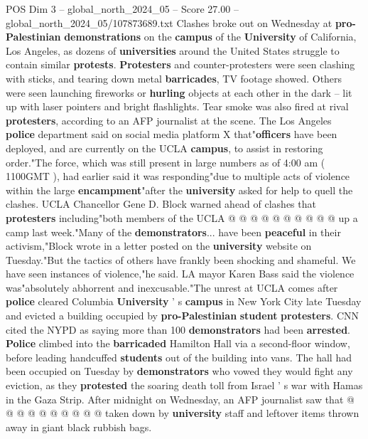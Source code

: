 \begin{textsample}{POS Dim 3 – global\_north\_2024\_05 – Score 27.00 – global\_north\_2024\_05/107873689.txt}  \label{ex:f3_pos_009}
Clashes broke out on Wednesday at \textbf{pro-Palestinian} \textbf{demonstrations} on the \textbf{campus} of the \textbf{University} of California, Los Angeles, as dozens of \textbf{universities} around the United States struggle to contain similar \textbf{protests}. \textbf{Protesters} and counter-protesters were seen clashing with sticks, and tearing down metal \textbf{barricades}, TV footage showed.
Others were seen launching fireworks or \textbf{hurling} objects at each other in the dark -- lit up with laser pointers and bright flashlights.
Tear smoke was also fired at rival \textbf{protesters}, according to an AFP journalist at the scene.
The Los Angeles \textbf{police} department said on social media platform X that"\textbf{officers} have been deployed, and are currently on the UCLA \textbf{campus}, to assist in restoring order."The force, which was still present in large numbers as of 4:00 am ( 1100GMT ), had earlier said it was responding"due to multiple acts of violence within the large \textbf{encampment}"after the \textbf{university} asked for help to quell the clashes.
UCLA Chancellor Gene D.
Block warned ahead of clashes that \textbf{protesters} including"both members of the UCLA @ @ @ @ @ @ @ @ @ @ up a camp last week."Many of the \textbf{demonstrators}... have been \textbf{peaceful} in their activism,"Block wrote in a letter posted on the \textbf{university} website on Tuesday."But the tactics of others have frankly been shocking and shameful.
We have seen instances of violence,"he said.
LA mayor Karen Bass said the violence was"absolutely abhorrent and inexcusable."The unrest at UCLA comes after \textbf{police} cleared Columbia \textbf{University} ' s \textbf{campus} in New York City late Tuesday and evicted a building occupied by \textbf{pro-Palestinian} \textbf{student} \textbf{protesters}.
CNN cited the NYPD as saying more than 100 \textbf{demonstrators} had been \textbf{arrested}. \textbf{Police} climbed into the \textbf{barricaded} Hamilton Hall via a second-floor window, before leading handcuffed \textbf{students} out of the building into vans.
The hall had been occupied on Tuesday by \textbf{demonstrators} who vowed they would fight any eviction, as they \textbf{protested} the soaring death toll from Israel ' s war with Hamas in the Gaza Strip.
After midnight on Wednesday, an AFP journalist saw that @ @ @ @ @ @ @ @ @ @ taken down by \textbf{university} staff and leftover items thrown away in giant black rubbish bags.

\end{textsample}
